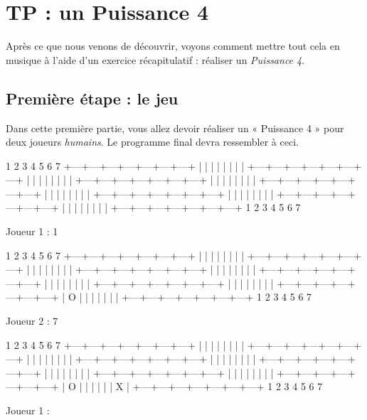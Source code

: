 \chapter{TP : un Puissance 4}
\label{tp-:-un-puissance-4}

Après ce que nous venons de découvrir, voyons comment mettre tout cela en
musique à l'aide d'un exercice récapitulatif : réaliser un \emph{Puissance 4}.
  
\section{Première étape : le jeu}
\label{premiere-etape-:-le-jeu}
  
Dans cette première partie, vous allez devoir
réaliser un « Puissance 4 » pour deux joueurs \emph{humains}. Le
programme final devra ressembler à ceci.

\begin{C}
  1   2   3   4   5   6   7  
+---+---+---+---+---+---+---+
|   |   |   |   |   |   |   |
+---+---+---+---+---+---+---+
|   |   |   |   |   |   |   |
+---+---+---+---+---+---+---+
|   |   |   |   |   |   |   |
+---+---+---+---+---+---+---+
|   |   |   |   |   |   |   |
+---+---+---+---+---+---+---+
|   |   |   |   |   |   |   |
+---+---+---+---+---+---+---+
|   |   |   |   |   |   |   |
+---+---+---+---+---+---+---+
  1   2   3   4   5   6   7  

Joueur 1 : 1

  1   2   3   4   5   6   7  
+---+---+---+---+---+---+---+
|   |   |   |   |   |   |   |
+---+---+---+---+---+---+---+
|   |   |   |   |   |   |   |
+---+---+---+---+---+---+---+
|   |   |   |   |   |   |   |
+---+---+---+---+---+---+---+
|   |   |   |   |   |   |   |
+---+---+---+---+---+---+---+
|   |   |   |   |   |   |   |
+---+---+---+---+---+---+---+
| O |   |   |   |   |   |   |
+---+---+---+---+---+---+---+
  1   2   3   4   5   6   7  

Joueur 2 : 7

  1   2   3   4   5   6   7  
+---+---+---+---+---+---+---+
|   |   |   |   |   |   |   |
+---+---+---+---+---+---+---+
|   |   |   |   |   |   |   |
+---+---+---+---+---+---+---+
|   |   |   |   |   |   |   |
+---+---+---+---+---+---+---+
|   |   |   |   |   |   |   |
+---+---+---+---+---+---+---+
|   |   |   |   |   |   |   |
+---+---+---+---+---+---+---+
| O |   |   |   |   |   | X |
+---+---+---+---+---+---+---+
  1   2   3   4   5   6   7  

Joueur 1 :
\end{C}

